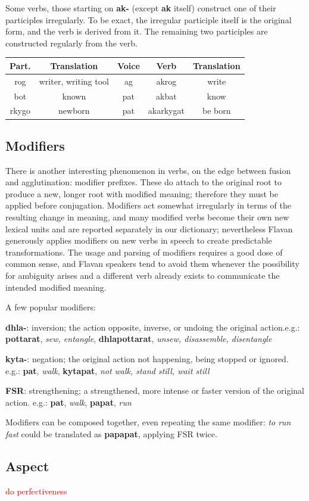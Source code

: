 \documentclass[10pt,oneside]{memoir}
\newcommand{\cmmnt}[1]{\textcolor{red}{#1}}
\begin{document}
\begin{multicols}{2}
Some verbs, those starting on \textbf{ak-} (except \textbf{ak} itself) construct one of their participles irregularly. To be exact, the irregular participle itself is the original form, and the verb is derived from it. The remaining two participles are constructed regularly from the verb.

{\small
\begin{tabular}[]{*{5}{c}}
    Part. & Translation & Voice & Verb & Translation\\
    \hline
    rog & writer, writing tool & ag & akrog & write\\
    bot & known                 & pat & akbat & know\\
    rkygo & newborn & pat & akarkygat & be born\\
   
\end{tabular}
}

\subsection{Modifiers}

There is another interesting phenomenon in verbs, on the edge between fusion and agglutination: modifier prefixes. These do attach to the original root to produce a new, longer root with modified meaning; therefore they must be applied before conjugation. Modifiers act somewhat irregularly in terms of the resulting change in meaning, and many modified verbs become their own new lexical units and are reported separately in our dictionary; nevertheless Flavan generously applies modifiers on new verbs in speech to create predictable transformations. The usage and parsing of modifiers requires a good dose of common sense, and Flavan speakers tend to avoid them whenever the possibility for ambiguity arises and a different verb already exists to communicate the intended modified meaning.

A few popular modifiers:

\textbf{dhla-}: inversion; the action opposite, inverse, or undoing the original action.e.g.: \textbf{pottarat}, \emph{sew, entangle}, \textbf{dhlapottarat}, \emph{unsew, disassemble, disentangle}

\textbf{kyta-}: negation; the original action not happening, being stopped or ignored. e.g.: \textbf{pat}, \emph{walk}, \textbf{kytapat}, \emph{not walk, stand still, wait still}

\textbf{FSR}: strengthening; a strengthened, more intense or faster version of the original action. e.g.: \textbf{pat}, \emph{walk}, \textbf{papat}, \emph{run}
		
Modifiers can be composed together, even repeating the same modifier: \emph{to run fast} could be translated as \textbf{papapat}, applying FSR twice.

	\subsection{Aspect}

    \cmmnt{do perfectiveness}

\end{multicols}
\end{document}
